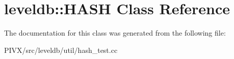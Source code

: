 \hypertarget{classleveldb_1_1_h_a_s_h}{}\section{leveldb\+:\+:H\+A\+SH Class Reference}
\label{classleveldb_1_1_h_a_s_h}


The documentation for this class was generated from the following file\+:\begin{DoxyCompactItemize}
\item 
P\+I\+V\+X/src/leveldb/util/hash\+\_\+test.\+cc\end{DoxyCompactItemize}
